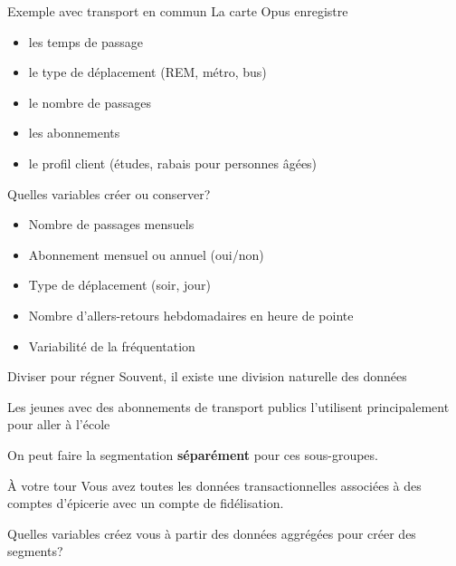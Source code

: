 \documentclass[
  ignorenonframetext,
]{beamer}
\providecommand{\tightlist}{%
  \setlength{\itemsep}{0pt}\setlength{\parskip}{0pt}}\usepackage{longtable,booktabs,array}
\begin{document}
\begin{frame}{Exemple avec transport en commun}
\protect\hypertarget{exemple-avec-transport-en-commun}{}
La carte Opus enregistre

\begin{itemize}
\tightlist
\item
  les temps de passage
\item
  le type de déplacement (REM, métro, bus)
\item
  le nombre de passages
\item
  les abonnements
\item
  le profil client (études, rabais pour personnes âgées)
\end{itemize}
\end{frame}

\begin{frame}{Quelles variables créer ou conserver?}
\protect\hypertarget{quelles-variables-cruxe9er-ou-conserver}{}
\begin{itemize}
\tightlist
\item
  Nombre de passages mensuels
\item
  Abonnement mensuel ou annuel (oui/non)
\item
  Type de déplacement (soir, jour)
\item
  Nombre d'allers-retours hebdomadaires en heure de pointe
\item
  Variabilité de la fréquentation
\end{itemize}
\end{frame}

\begin{frame}{Diviser pour régner}
\protect\hypertarget{diviser-pour-ruxe9gner}{}
Souvent, il existe une division naturelle des données

Les jeunes avec des abonnements de transport publics l'utilisent
principalement pour aller à l'école

On peut faire la segmentation \textbf{séparément} pour ces sous-groupes.
\end{frame}

\begin{frame}{À votre tour}
\protect\hypertarget{uxe0-votre-tour}{}
Vous avez toutes les données transactionnelles associées à des comptes
d'épicerie avec un compte de fidélisation.

Quelles variables créez vous à partir des données aggrégées pour créer
des segments?
\end{frame}
\end{document}
